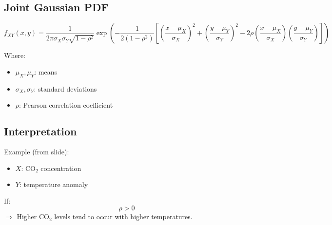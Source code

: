 \documentclass[12pt]{article}
\begin{document}
\subsection{Joint Gaussian PDF}

\[
f_{XY}(x,y) =
\frac{1}{2\pi \sigma_X \sigma_Y \sqrt{1-\rho^2}}
\exp \left(
-\frac{1}{2(1-\rho^2)}
\left[
\left(\frac{x-\mu_X}{\sigma_X}\right)^2
+
\left(\frac{y-\mu_Y}{\sigma_Y}\right)^2
-
2\rho
\left(\frac{x-\mu_X}{\sigma_X}\right)
\left(\frac{y-\mu_Y}{\sigma_Y}\right)
\right]
\right)
\]

Where:
\begin{itemize}
\item $\mu_X, \mu_Y$: means
\item $\sigma_X, \sigma_Y$: standard deviations
\item $\rho$: Pearson correlation coefficient
\end{itemize}

\subsection{Interpretation}

Example (from slide):

\begin{itemize}
\item $X$: CO$_2$ concentration
\item $Y$: temperature anomaly
\end{itemize}

If:
\[
\rho > 0
\]
$\Rightarrow$ Higher CO$_2$ levels tend to occur with higher temperatures.
\end{document}
